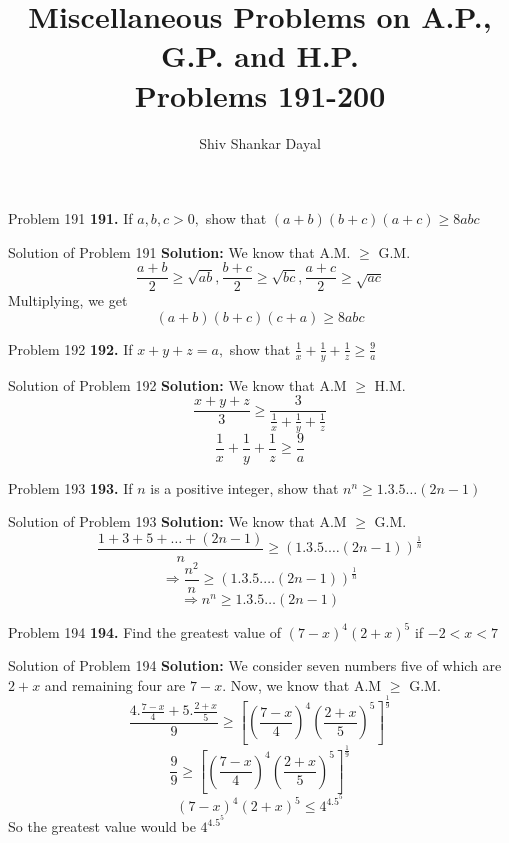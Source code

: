 \documentclass[aspectratio=1610,8pt]{beamer}
\title{Miscellaneous Problems on A.P., G.P. and H.P.\\Problems 191-200}
\author[Shiv Shankar Dayal]{Shiv Shankar Dayal}
\begin{document}
\begin{frame}
  \titlepage
\end{frame}
\begin{frame}{Problem 191}
  \textbf{191.} If $a,b,c > 0,$ show that $(a + b)(b + c)(a + c) \geq 8abc$
\end{frame}
\begin{frame}{Solution of Problem 191}
  \textbf{Solution:} We know that A.M. $\geq$ G.M.
  $$\frac{a + b}{2}\geq \sqrt{ab}, \frac{b + c}{2}\geq \sqrt{bc}, \frac{a + c}{2}\geq \sqrt{ac}$$
  Multiplying, we get
  $$(a + b)(b + c)(c + a) \geq 8abc$$
\end{frame}
\begin{frame}{Problem 192}
  \textbf{192.} If $x + y + z = a,$ show that $\frac{1}{x} + \frac{1}{y} + \frac{1}{z}\geq \frac{9}{a}$
\end{frame}
\begin{frame}{Solution of Problem 192}
  \textbf{Solution:} We know that A.M $\geq$ H.M.
  $$\frac{x + y + z}{3}\geq \frac{3}{\frac{1}{x} + \frac{1}{y} + \frac{1}{z}}$$
  $$\frac{1}{x} + \frac{1}{y} + \frac{1}{z}\geq \frac{9}{a}$$
\end{frame}
\begin{frame}{Problem 193}
  \textbf{193.} If $n$ is a positive integer, show that $n^n \geq 1.3.5\ldots (2n - 1)$
\end{frame}
\begin{frame}{Solution of Problem 193}
  \textbf{Solution:} We know that A.M $\geq$ G.M.
  $$\frac{1 + 3 + 5 + \ldots + (2n - 1)}{n}\geq (1.3.5.\ldots(2n - 1))^{\frac{1}{n}}$$
  $$\Rightarrow \frac{n^2}{n}\geq (1.3.5.\ldots(2n - 1))^{\frac{1}{n}}$$
  $$\Rightarrow n^n \geq 1.3.5\ldots (2n - 1)$$
\end{frame}
\begin{frame}{Problem 194}
  \textbf{194.} Find the greatest value of $(7 - x)^4(2 + x)^5$ if $-2<x<7$
\end{frame}
\begin{frame}{Solution of Problem 194}
  \textbf{Solution:} We consider seven numbers five of which are $2 + x$ and remaining four are $7 - x.$ Now, we know that A.M
  $\geq$ G.M.
  $$\frac{4.\frac{7 - x}{4} + 5.\frac{2 + x}{5}}{9}\geq \left[\left(\frac{7 - x}{4}\right)^4\left(\frac{2 +
      x}{5}\right)^5\right]^{\frac{1}{9}}$$
  $$\frac{9}{9}\geq \left[\left(\frac{7 - x}{4}\right)^4\left(\frac{2 + x}{5}\right)^5\right]^{\frac{1}{9}}$$
  $$(7 - x)^4(2 + x)^5 \leq 4^4.5^5$$
  So the greatest value would be $4^4.5^5$
\end{frame}
\end{document}
